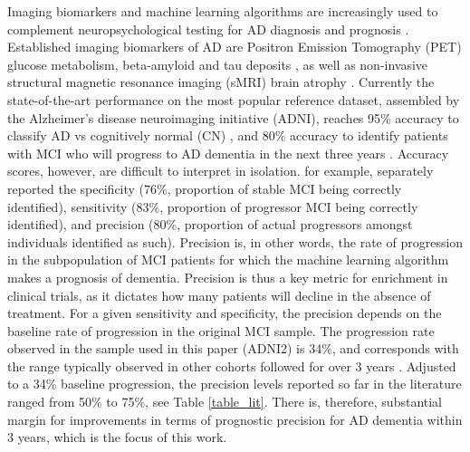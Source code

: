 \documentclass[authoryear]{elsarticle}
\begin{document}
Imaging biomarkers and machine learning algorithms are increasingly used to complement neuropsychological testing for AD diagnosis and prognosis \citep{Dubois2007,Rathore2017review}. Established imaging biomarkers of AD are Positron Emission Tomography (PET) glucose metabolism, beta-amyloid and tau deposits \citep{Fodero2011,Sperling2011}, as well as non-invasive structural magnetic resonance imaging (sMRI) brain atrophy \citep{Lerch2005a}. Currently the state-of-the-art performance on the most popular reference dataset, assembled by the Alzheimer's disease neuroimaging initiative (ADNI), reaches 95\% accuracy to classify AD vs cognitively normal (CN) \citep{Fan2008a,Zhu2014,Xu2015,Zu2016}, and 80\% accuracy to identify patients with MCI who will progress to AD dementia in the next three years \citep{Mathotaarachchi2017,Moradi2015,Eskildsen2013,Wee2013,Gaser2013,Davatzikos2011,Koikkalainen2011,Misra2009}. Accuracy scores, however, are difficult to interpret in isolation. \cite{Korolev2016} for example, separately reported the specificity (76\%, proportion of stable MCI being correctly identified), sensitivity (83\%, proportion of progressor MCI being correctly identified), and precision (80\%, proportion of actual progressors amongst individuals identified as such). Precision is, in other words, the rate of progression in the subpopulation of MCI patients for which the machine learning algorithm makes a prognosis of dementia. Precision is thus a key metric for enrichment in clinical trials, as it dictates how many patients will decline in the absence of treatment. For a given sensitivity and specificity, the precision depends on the baseline rate of progression in the original MCI sample. The progression rate observed in the sample used in this paper (ADNI2) is 34\%, and corresponds with the range typically observed in other cohorts followed for over 3 years \citep{Mitchell2009}. Adjusted to a 34\% baseline progression, the precision levels reported so far in the literature ranged from 50\% to 75\%, see Table \ref{table_lit}. There is, therefore, substantial margin for improvements in terms of prognostic precision for AD dementia within 3 years, which is the focus of this work. 
\end{document}
